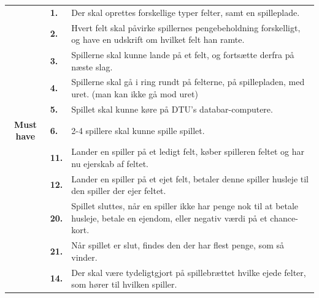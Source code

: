 \begin{center}
    \begin{tabular}{ || c | l | p{11.5cm} ||}
        \hline
        \hline
    &        
    \textbf{1.}
    &
    Der skal oprettes forskellige typer felter, samt en spilleplade. 
    \\

    \cline{2-3}
    &
    \textbf{2.}
    & 
    Hvert felt skal påvirke spillernes pengebeholdning forskelligt, og have en udskrift om hvilket felt han ramte. \\
    
    \cline{2-3}
    &
    \textbf{3.}
    &
    Spillerne skal kunne lande på et felt, og fortsætte derfra på næste slag.
    \\

    \cline{2-3}
    &
    \textbf{4.}
    &
    Spillerne skal gå i ring rundt på felterne, på spillepladen, med uret. (man kan ikke gå mod uret)
    \\

    \cline{2-3}
    &
    \textbf{5.} 
    &
    Spillet skal kunne køre på DTU’s databar-computere.
    \\
    
    \cline{2-3}
    \textbf{Must have}
    &
    \textbf{6.}
    &
    2-4 spillere skal kunne spille spillet.
    \\
    
    \cline{2-3}
    &
    \textbf{11.}
    &
    Lander en spiller på et ledigt felt, køber spilleren feltet og 
    har nu ejerskab af feltet.
    \\

    \cline{2-3}
    &
    \textbf{12.}
    &
    Lander en spiller på et ejet felt, betaler denne spiller husleje til den spiller der ejer feltet.
    \\

    \cline{2-3}
    &
    \textbf{20.}
    &
    Spillet sluttes, når en spiller ikke har penge nok til at betale husleje, betale en ejendom, eller negativ værdi på et chance-kort.
    \\

    \cline{2-3}
    &
    \textbf{21.}
    &
    Når spillet er slut, findes den der har flest penge, som så vinder.
    \\
    
    \hline
    \hline
     &
     \textbf{14.}
     &
     Der skal være tydeligtgjort på spillebrættet hvilke ejede felter, som hører til hvilken spiller.
     \\


\end{tabular}
\end{center}
